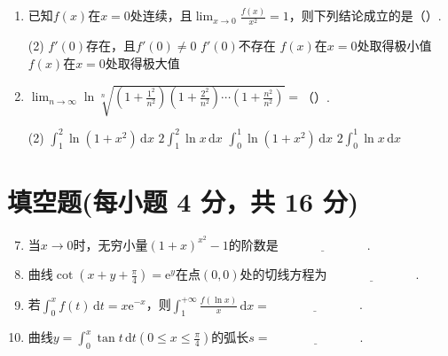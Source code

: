\documentclass[../main.tex]{subfiles}
\begin{document}
\begin{enumerate}
          \begin{tasks}[label=\textbf{\Alph*.}, label-width=1.5em, column-sep=1em](2)
              \task $f(x)\geq0$
              \task $f(x)>0$
              \task 不能确定$f(x)$的符号
              \task $f(x)$单调趋向于$+\infty$
          \end{tasks}

    \item 已知$f(x)$在$x=0$处连续，且$\lim_{x\to0}\frac{f(x)}{x^{2}}=1$，则下列结论成立的是（\qquad）.

          \begin{tasks}[label=\textbf{\Alph*.}, label-width=1.5em, column-sep=1em](2)
              \task $f'(0)$存在，且$f'(0)\neq0$
              \task $f'(0)$不存在
              \task $f(x)$在$x=0$处取得极小值
              \task $f(x)$在$x=0$处取得极大值
          \end{tasks}

    \item $\lim_{n\to\infty}\ln\sqrt[n]{\left(1+\frac{1^{2}}{n^{2}}\right)\left(1+\frac{2^{2}}{n^{2}}\right)\cdots\left(1+\frac{n^{2}}{n^{2}}\right)}
              =$（\qquad）.

          \begin{tasks}[label=\textbf{\Alph*.}, label-width=1.5em, column-sep=1em](2)
              \task $\int_{1}^{2}\ln(1+x^{2})\,\mathrm{d}x$
              \task $2\int_{1}^{2}\ln x\,\mathrm{d}x$
              \task $\int_{0}^{1}\ln(1+x^{2})\,\mathrm{d}x$
              \task $2\int_{0}^{1}\ln x\,\mathrm{d}x$
          \end{tasks}
\end{enumerate}

\section{填空题(每小题 4 分，共 16 分)}
\begin{enumerate}
    \setcounter{enumi}{6}
    \item 当$x\to0$时，无穷小量$\left(1+x\right)^{x^2}-1$的阶数是$\underline
              {\hspace{3cm}}$.

    \item 曲线$\cot\left(x+y+\frac{\pi}{4}\right)=\mathrm{e}^{y}$在点$(0,0)$处的切线方程为$\underline
              {\hspace{3cm}}$.

    \item 若$\int_{0}^{x}f(t)\,\mathrm{d}t=x\mathrm{e}^{-x}$，则$\int_{1}^{+\infty}
              \frac{f(\ln x)}{x}\,\mathrm{d}x=\underline{\hspace{3cm}}$.

    \item 曲线$y=\int_{0}^{x}\tan t\,\mathrm{d}t\left(0\leq x\leq \frac{\pi}{4}
              \right)$的弧长$s=\underline{\hspace{3cm}}$.
\end{enumerate}
\end{document}
